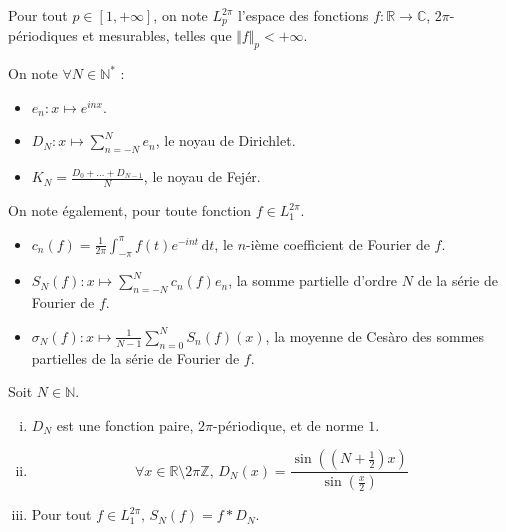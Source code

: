 




	
	\begin{notation}
		Pour tout $p \in [1, +\infty]$, on note $L_p^{2\pi}$ l'espace des fonctions $f : \mathbb{R} \rightarrow \mathbb{C}$, $2\pi$-périodiques et mesurables, telles que $\Vert f \Vert_p < +\infty$.
	\end{notation}
	
	\begin{notation}
		On note $\forall N \in \mathbb{N}^*$ :
		\begin{itemize}
			\item $e_n : x \mapsto e^{inx}$.
			\item $D_N : x \mapsto \sum_{n=-N}^N e_n$, le noyau de Dirichlet.
			\item $K_N = \frac{D_0 + \dots + D_{N-1}}{N}$, le noyau de Fejér.
		\end{itemize}
	\end{notation}
	
	\begin{notation}
		On note également, pour toute fonction $f \in L_1^{2\pi}$.
		\begin{itemize}
			\item $c_n(f) = \frac{1}{2\pi} \int_{- \pi}^\pi f(t) e^{-int} \, \mathrm{d}t$, le $n$-ième coefficient de Fourier de $f$.
			\item $S_N(f) : x \mapsto \sum_{n=-N}^N c_n(f) e_n$, la somme partielle d'ordre $N$ de la série de Fourier de $f$.
			\item $\sigma_N(f) : x \mapsto \frac{1}{N - 1} \sum_{n=0}^N S_n(f)(x)$, la moyenne de Cesàro des sommes partielles de la série de Fourier de $f$.
		\end{itemize}
	\end{notation}
	
	
	\begin{lemma}
		\label{theoreme-de-fejer-1}
		Soit $N \in \mathbb{N}$.
		\begin{enumerate}[(i)]
			\item $D_N$ est une fonction paire, $2\pi$-périodique, et de norme $1$.
			\item \[ \forall x \in \mathbb{R} \setminus 2 \pi \mathbb{Z}, \, D_N(x) = \frac{\sin \left(\left( N + \frac{1}{2} \right) x \right)}{\sin \left( \frac{x}{2} \right)} \]
			\item Pour tout $f \in L_1^{2 \pi}, \, S_N(f) = f * D_N$.
		\end{enumerate}
	\end{lemma}
	
